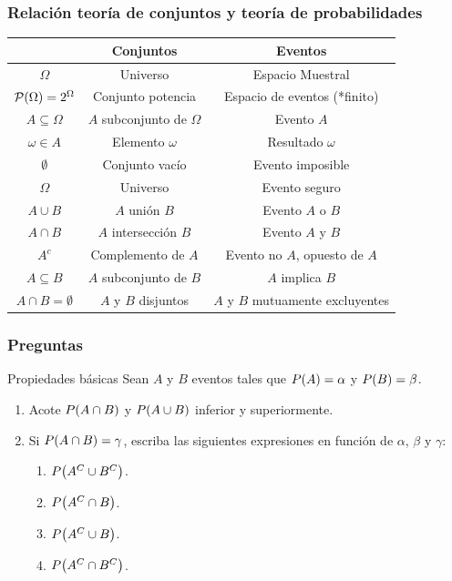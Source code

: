\documentclass[table]{beamer}
\begin{document}
\begin{frame}
    \frametitle{Relación teoría de conjuntos y teoría de probabilidades}
    \begin{center}
        \begin{tabular}{c|c|c}
            & Conjuntos & Eventos \\
            \hline
            $\Omega$ & Universo & Espacio Muestral \\
            $\mathcal{P} \parens{\Omega} = 2^{\Omega}$ & Conjunto potencia & Espacio de eventos (*finito) \\
            $A \subseteq \Omega$ & $A$ subconjunto de $\Omega$ & Evento $A$ \\
            $\omega \in A$ & Elemento $\omega$ & Resultado $\omega$ \\
            $\emptyset$ & Conjunto vacío & Evento imposible \\
            $\Omega$ & Universo & Evento seguro \\
            $A \cup B$ & $A$ unión $B$ & Evento $A$ o $B$ \\
            $A \cap B$ & $A$ intersección $B$ & Evento $A$ y $B$ \\
            $A^{c}$ & Complemento de $A$ & Evento no $A$, opuesto de $A$ \\
            $A \subseteq B$ & $A$ subconjunto de $B$ & $A$ implica $B$ \\
            $A \cap B = \emptyset$ & $A$ y $B$ disjuntos & $A$ y $B$ mutuamente excluyentes \\
        \end{tabular}
    \end{center}
\end{frame}

\begin{frame}
    \frametitle{Preguntas}
    \begin{exampleblock}{Propiedades básicas}
        Sean $A$ y $B$ eventos tales que $\prob{A} = \alpha$ y $\prob{B} = \beta$.
        \begin{enumerate}
            \item Acote $\prob{A \cap B}$ y $\prob{A \cup B}$ inferior y superiormente.
            \item Si $\prob{A \cap B} = \gamma$, escriba las siguientes expresiones en función de $\alpha$, $\beta$ y $\gamma$:
                \begin{enumerate}
                    \item $\prob{A^{C} \cup B^{C}}$.
                    \item $\prob{A^{C} \cap B}$.
                    \item $\prob{A^{C} \cup B}$.
                    \item $\prob{A^{C} \cap B^{C}}$.
                \end{enumerate}
        \end{enumerate}
    \end{exampleblock}
\end{frame}
\end{document}

